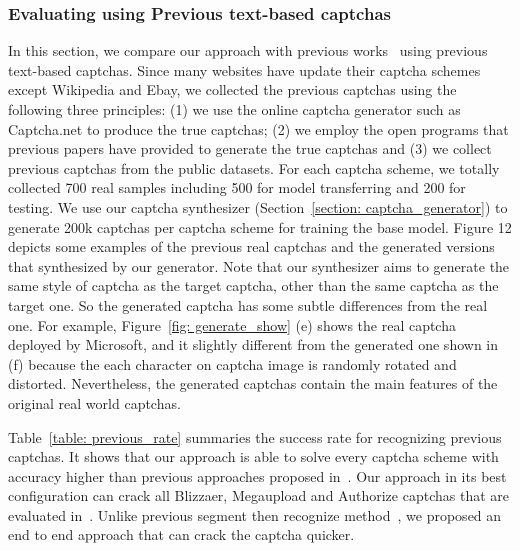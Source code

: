 \subsubsection{Evaluating using Previous text-based captchas}
In this section, we compare our approach with previous works~\cite{Bursztein2011Text,Gao2016A,Bursztein2014The,George2017A} using previous text-based captchas. Since many websites have update their captcha schemes except Wikipedia and Ebay, we collected the previous captchas using the following three principles: (1) we use the online captcha generator such as Captcha.net to produce the true captchas; (2) we employ the open programs that previous papers have provided to generate the true captchas and (3) we collect previous captchas from the public datasets. For each captcha scheme, we totally collected 700 real samples including 500 for model transferring and 200 for testing. We use our captcha synthesizer (Section~\ref{section: captcha_generator}) to generate 200k captchas per captcha scheme for training the base model. Figure 12 depicts some examples of the previous real captchas and the generated versions that synthesized by our generator. Note that our synthesizer aims to generate the same style of captcha as the target captcha, other than the same captcha as the target one. So the generated captcha has some subtle differences from the real one. For example, Figure~\ref{fig: generate_show} (e) shows the real captcha deployed by Microsoft, and it slightly different from the generated one shown in (f) because the each character on captcha image is randomly rotated and distorted. Nevertheless, the generated captchas contain the main features of the original real world captchas.

Table~\ref{table: previous_rate} summaries the success rate for recognizing previous captchas. It shows that our approach is able to solve every captcha scheme with accuracy higher than previous approaches proposed in~\cite{Bursztein2011Text,Gao2016A,Bursztein2014The,George2017A}. Our approach in its best configuration can crack all Blizzaer, Megaupload and Authorize captchas that are evaluated in~\cite{Bursztein2011Text}. Unlike previous segment then recognize method~\cite{Bursztein2011Text,Gao2016A,Bursztein2014The,George2017A}, we proposed an end to end approach that can crack the captcha quicker.

